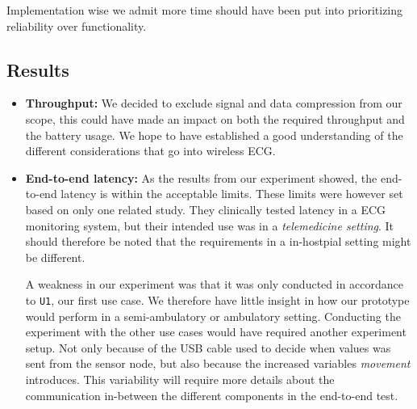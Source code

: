Implementation wise we admit more time should have been put into prioritizing reliability over functionality.


\subsection{Results} %
\label{sub:results}


\begin{itemize}

  \item \textbf{Throughput:} We decided to exclude signal and data compression from our scope, this could have made an impact on both the required throughput and the battery usage. We hope to have established a good understanding of the different considerations that go into wireless ECG.
  \item \textbf{End-to-end latency:} As the results from our experiment showed, the end-to-end latency is within the acceptable limits. These limits were however set based on only one related study. They clinically tested latency in a ECG monitoring system, but their intended use was in a \emph{telemedicine setting}. It should therefore be noted that the requirements in a in-hostpial setting might be different.
  
  A weakness in our experiment was that it was only conducted in accordance to \texttt{U1}, our first use case. We therefore have little insight in how our prototype would perform in a semi-ambulatory or ambulatory setting. Conducting the experiment with the other use cases would have required another experiment setup. Not only because of the USB cable used to decide when values was sent from the sensor node, but also because the increased variables \emph{movement} introduces. This variability will require more details about the communication in-between the different components in the end-to-end test. 
  

\end{itemize}
